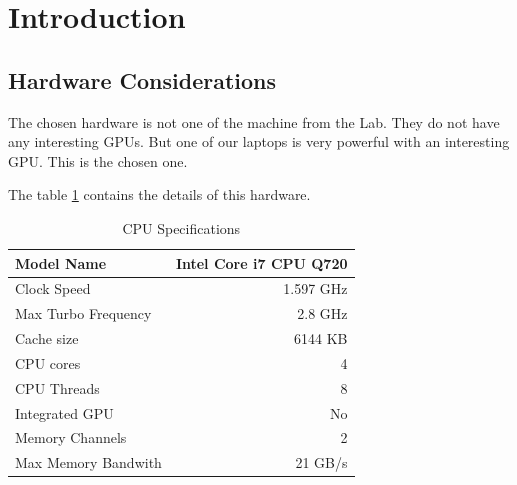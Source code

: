 \documentclass[fleqn,10pt]{SelfArx} %
\affiliation{\textsuperscript{1} \hfill \textsuperscript{2}AC5612 \hfill \textsuperscript{3}}
\begin{document}



\flushbottom %

\maketitle %

\tableofcontents %

\thispagestyle{empty} %

\section{Introduction}


\subsection{Hardware Considerations}

The chosen hardware is not one of the machine from the Lab. They do not have any interesting GPUs. But one of our laptops is very powerful with an interesting GPU. This is the chosen one.

The table \ref{CPUspec} contains the details of this hardware.
\begin{table}[h]
\centering
\begin{tabular}{|l|r|}
\hline
Model Name & Intel Core i7 CPU Q720 \\
\hline
Clock Speed & 1.597 GHz \\
\hline
Max Turbo Frequency & 2.8 GHz \\
\hline
Cache size & 6144 KB \\
\hline
CPU cores & 4 \\
\hline
CPU Threads & 8 \\
\hline
Integrated GPU & No \\
\hline
Memory Channels & 2 \\
\hline
Max Memory Bandwith & 21 GB/s \\
\hline
\end{tabular}
\caption{CPU Specifications}
\label{CPUspec}
\end{table}
\end{document}
